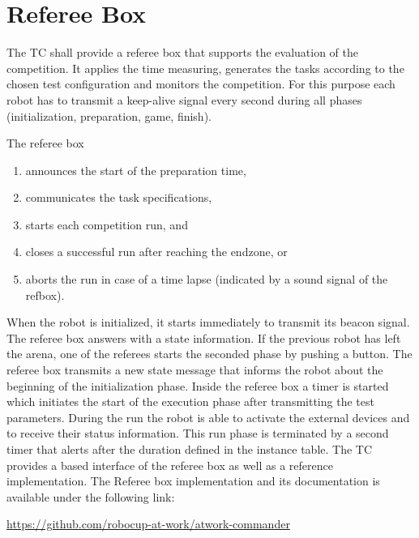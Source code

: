 
\section{Referee Box}
\label{sec:refbox}

The TC shall provide a referee box that supports the evaluation of the competition. It applies the time measuring, generates the tasks according to the chosen test configuration and monitors the
competition. For this purpose each robot has to transmit a keep-alive signal every second during all phases (initialization, preparation, game, finish).

The referee box
\begin{enumerate}
	\item announces the start of the preparation time,
	\item communicates the task specifications,
	\item starts each competition run, and
	\item closes a successful run after reaching the endzone, or
	\item aborts the run in case of a time lapse (indicated by a sound signal of the refbox).
\end{enumerate}

When the robot is initialized, it starts immediately to transmit its beacon
signal. The referee box answers with a state information. If the previous robot
has left the arena, one of the referees starts the seconded phase by pushing a
button. The referee box transmits a new state message that informs the robot
about the beginning of the initialization phase. Inside the referee box a
timer is started which initiates the start of the execution phase after
transmitting the test parameters. During the run the robot is able to activate
the external devices and to receive their status information. This run phase is
terminated by a second timer that alerts after the duration defined in the
instance table.
%
% 
The TC provides a  based interface of the referee box as well as
a reference implementation.
The Referee box implementation and its documentation is available under the following link:
\begin{center}
	\url{https://github.com/robocup-at-work/atwork-commander}
	
\end{center}



